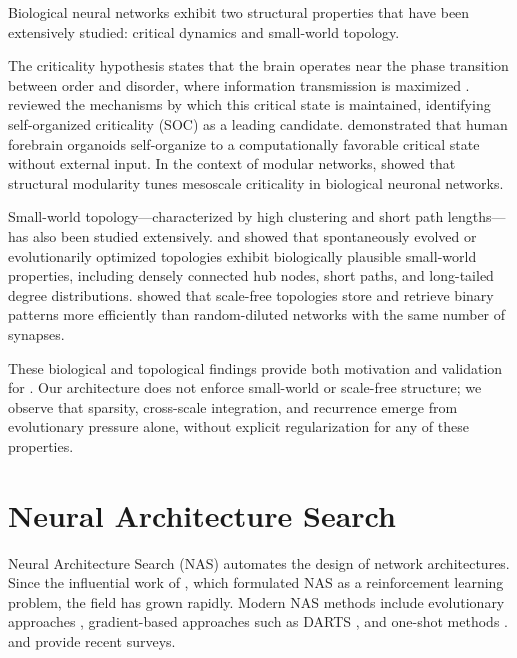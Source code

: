 Biological neural networks exhibit two structural properties that have
been extensively studied: critical dynamics and small-world topology.

The criticality hypothesis states that the brain operates near the phase
transition between order and disorder, where information transmission is
maximized \citep{beggs2003neuronal}. \citet{poil2025network} reviewed
the mechanisms by which this critical state is maintained, identifying
self-organized criticality (SOC) as a leading candidate.
\citet{organoid2026criticality} demonstrated that human forebrain
organoids self-organize to a computationally favorable critical state
without external input. In the context of modular networks,
\citet{hierarchicalmodular2025} showed that structural modularity tunes
mesoscale criticality in biological neuronal networks.

Small-world topology---characterized by high clustering and short path
lengths---has also been studied extensively. \citet{emergence2024} and
\citet{evolutionarily2026} showed that spontaneously evolved or
evolutionarily optimized topologies exhibit biologically plausible
small-world properties, including densely connected hub nodes, short
paths, and long-tailed degree distributions. \citet{topology2004}
showed that scale-free topologies store and retrieve binary patterns
more efficiently than random-diluted networks with the same number of
synapses.

These biological and topological findings provide both motivation and
validation for \modnet{}. Our architecture does not enforce small-world
or scale-free structure; we observe that sparsity, cross-scale
integration, and recurrence emerge from evolutionary pressure alone,
without explicit regularization for any of these properties.

\section{Neural Architecture Search}
\label{sec:related-nas}

Neural Architecture Search (NAS) automates the design of network
architectures. Since the influential work of \citet{zoph2017neural},
which formulated NAS as a reinforcement learning problem, the field has
grown rapidly. Modern NAS methods include evolutionary approaches
\citep{real2019regularized}, gradient-based approaches such as DARTS
\citep{liu2019darts}, and one-shot methods \citep{pham2018efficient}.
\citet{ren2024advances} and \citet{ozcelik2026evolutionary} provide
recent surveys.

